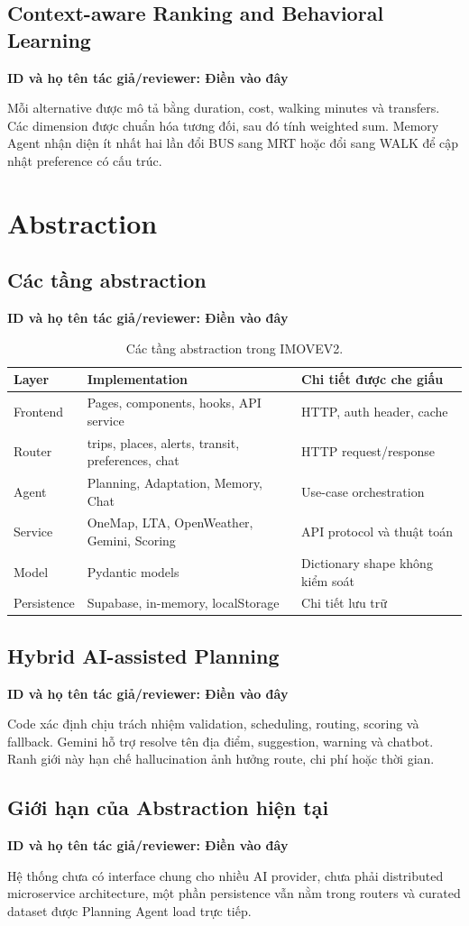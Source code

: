 \documentclass[12pt,a4paper,oneside]{report}
\newcommand{\tacgia}{%
  \begin{tcolorbox}[colback=blue!3,colframe=blue!25,boxrule=0.4pt,arc=1mm]
    \small\textbf{ID và họ tên tác giả/reviewer: Điền vào đây}
  \end{tcolorbox}
}
\begin{document}
\section{Context-aware Ranking and Behavioral Learning}
\tacgia
Mỗi alternative được mô tả bằng duration, cost, walking minutes và transfers. Các dimension được chuẩn hóa tương đối, sau đó tính weighted sum. Memory Agent nhận diện ít nhất hai lần đổi BUS sang MRT hoặc đổi sang WALK để cập nhật preference có cấu trúc.

\chapter{Abstraction}
\section{Các tầng abstraction}
\tacgia
\begin{table}[H]
\centering
\begin{tabularx}{\textwidth}{p{3.5cm}X X}
\toprule
\textbf{Layer} & \textbf{Implementation} & \textbf{Chi tiết được che giấu} \\
\midrule
Frontend & Pages, components, hooks, API service & HTTP, auth header, cache \\
Router & trips, places, alerts, transit, preferences, chat & HTTP request/response \\
Agent & Planning, Adaptation, Memory, Chat & Use-case orchestration \\
Service & OneMap, LTA, OpenWeather, Gemini, Scoring & API protocol và thuật toán \\
Model & Pydantic models & Dictionary shape không kiểm soát \\
Persistence & Supabase, in-memory, localStorage & Chi tiết lưu trữ \\
\bottomrule
\end{tabularx}
\caption{Các tầng abstraction trong IMOVEV2.}
\end{table}

\section{Hybrid AI-assisted Planning}
\tacgia
Code xác định chịu trách nhiệm validation, scheduling, routing, scoring và fallback. Gemini hỗ trợ resolve tên địa điểm, suggestion, warning và chatbot. Ranh giới này hạn chế hallucination ảnh hưởng route, chi phí hoặc thời gian.

\section{Giới hạn của Abstraction hiện tại}
\tacgia
Hệ thống chưa có interface chung cho nhiều AI provider, chưa phải distributed microservice architecture, một phần persistence vẫn nằm trong routers và curated dataset được Planning Agent load trực tiếp.
\end{document}
